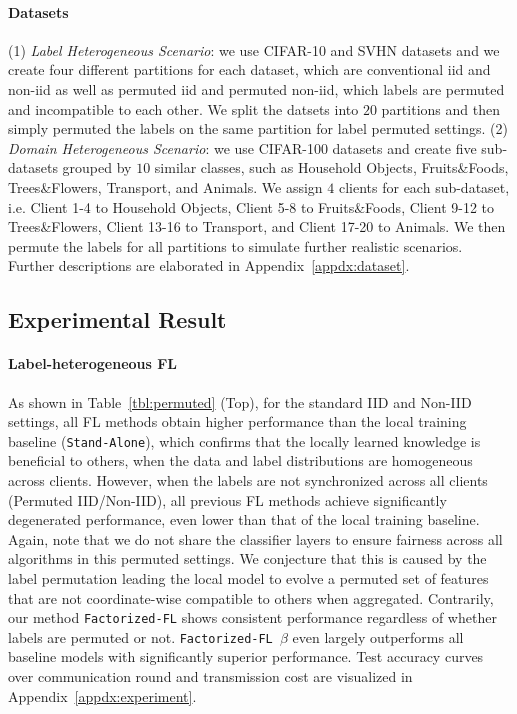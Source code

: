 \paragraph{Datasets} (1) \textit{Label Heterogeneous Scenario}: we use CIFAR-10 and SVHN datasets and we create four different partitions for each dataset, which are conventional iid and non-iid as well as permuted iid and permuted non-iid, which labels are permuted and incompatible to each other. We split the datsets into $20$ partitions and then simply permuted the labels on the same partition for label permuted settings. (2) \textit{Domain Heterogeneous Scenario}: we use CIFAR-100 datasets and create five sub-datasets grouped by $10$ similar classes, such as Household Objects, Fruits\&Foods, Trees\&Flowers, Transport, and Animals. We assign $4$ clients for each sub-dataset, i.e. Client 1-4 to Household Objects, Client 5-8 to Fruits\&Foods, Client 9-12 to Trees\&Flowers, Client 13-16 to Transport, and Client 17-20 to Animals. We then permute the labels for all partitions to simulate further realistic scenarios. Further descriptions are elaborated in Appendix~\ref{appdx:dataset}.


\subsection{Experimental Result}
\label{subsec:result}

\paragraph{Label-heterogeneous FL} 
As shown in Table~\ref{tbl:permuted} (Top), for the standard IID and Non-IID settings, all FL methods obtain higher performance than the local training baseline (\texttt{Stand-Alone}), which confirms that the locally learned knowledge is beneficial to others, when the data and label distributions are homogeneous across clients. However, when the labels are not synchronized across all clients (Permuted IID/Non-IID), all previous FL methods achieve significantly degenerated performance, even lower than that of the local training baseline. Again, note that we do not share the classifier layers to ensure fairness across all algorithms in this permuted settings. We conjecture that this is caused by the label permutation leading the local model to evolve a permuted set of features that are not coordinate-wise compatible to others when aggregated. Contrarily, our method \texttt{Factorized-FL} shows consistent performance regardless of whether labels are permuted or not. \texttt{Factorized-FL $\beta$} even largely outperforms all baseline models with significantly superior performance. Test accuracy curves over communication round and transmission cost are visualized in Appendix~\ref{appdx:experiment}.

